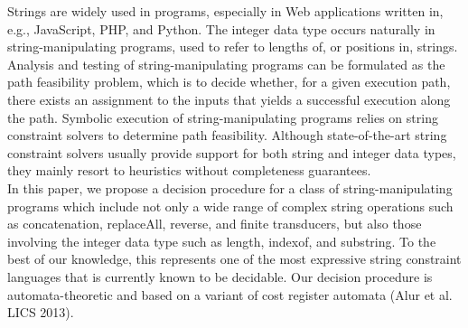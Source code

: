 
Strings are widely used in programs, especially in Web applications written in, e.g., JavaScript, PHP, and Python. The integer data type occurs naturally in string-manipulating programs, used to refer to lengths of, or positions in, strings. 
Analysis and testing of string-manipulating programs can be formulated as the path feasibility problem, which is to decide whether,  
for a given execution path, there exists an assignment to the inputs that yields a successful execution along the path. 
Symbolic execution of string-manipulating programs relies on string constraint solvers to determine  path feasibility.
Although state-of-the-art string constraint solvers usually provide support for both string and integer data types,   
they mainly resort to heuristics without completeness guarantees. \\ %
%
In this paper, we propose a decision procedure 
for a class of string-manipulating programs
which include  not only a wide range of complex string operations such as concatenation, replaceAll, reverse, and finite transducers, but also those involving the integer data type such as length, indexof, and substring. To the best of our knowledge, this represents one of the most expressive string constraint languages that is currently known to be decidable.  Our decision procedure is automata-theoretic and based on a variant of cost register automata (Alur et al. LICS 2013). 
